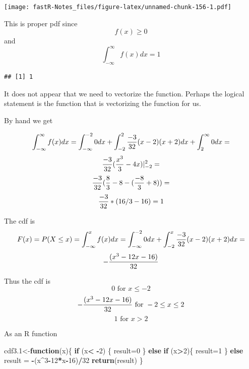 \documentclass[]{book}
\newenvironment{Shaded}{\begin{snugshade}}{\end{snugshade}}
\newcommand{\KeywordTok}[1]{\textcolor[rgb]{0.13,0.29,0.53}{\textbf{#1}}}
\newcommand{\DecValTok}[1]{\textcolor[rgb]{0.00,0.00,0.81}{#1}}
\newcommand{\StringTok}[1]{\textcolor[rgb]{0.31,0.60,0.02}{#1}}
\newcommand{\OtherTok}[1]{\textcolor[rgb]{0.56,0.35,0.01}{#1}}
\newcommand{\ControlFlowTok}[1]{\textcolor[rgb]{0.13,0.29,0.53}{\textbf{#1}}}
\newcommand{\OperatorTok}[1]{\textcolor[rgb]{0.81,0.36,0.00}{\textbf{#1}}}
\newcommand{\NormalTok}[1]{#1}
\theoremstyle{definition}
\theoremstyle{definition}
\theoremstyle{definition}
\theoremstyle{remark}
\begin{document}
\texttt{[image: fastR-Notes\_files/figure-latex/unnamed-chunk-156-1.pdf]}

This is proper pdf since \[f(x) \geq 0\] and
\[\int_{-\infty}^{\infty}f(x)dx=1\]

\begin{Shaded}
\end{Shaded}

\begin{verbatim}
## [1] 1
\end{verbatim}

It does not appear that we need to vectorize the function. Perhaps the
logical statement is the function that is vectorizing the function for
us.

By hand we get

\[\int_{-\infty}^{\infty}f(x)dx=\int_{-\infty}^{-2}0dx+\int_{-2}^{2}{-3 \over 32}(x-2)(x+2)dx+\int_{2}^{\infty}0dx=\]
\[{-3 \over 32}({x^3 \over 3} -4x) \vert_{-2}^{2}=\]
\[{-3 \over 32}({8 \over 3}-8 -({-8 \over 3} +8) )=\]
\[{-3 \over 32}*(16/3-16)=1\]

The cdf is
\[F(x)=P(X\leq x)=\int_{-\infty}^{x}f(x)dx=\int_{-\infty}^{-2}0dx+\int_{-2}^{x}{-3 \over 32}(x-2)(x+2)dx=\]
\[-{(x^3-12x-16) \over 32}\]

Thus the cdf is \[0 \mbox{ for }x \leq -2\]
\[-{(x^3-12x-16) \over 32} \mbox{ for } -2 \leq x \leq 2\]
\[1 \mbox{ for } x>2\]

As an R function

\begin{Shaded}
\begin{Highlighting}[]
\NormalTok{cdf3.}\DecValTok{1}\NormalTok{<-}\ControlFlowTok{function}\NormalTok{(x)\{}
    \ControlFlowTok{if}\NormalTok{ (x}\OperatorTok{<}\StringTok{ }\OperatorTok{-}\DecValTok{2}\NormalTok{) \{}
\NormalTok{        result=}\DecValTok{0}
\NormalTok{    \} }\ControlFlowTok{else} \ControlFlowTok{if}\NormalTok{ (x}\OperatorTok{>}\DecValTok{2}\NormalTok{)\{}
\NormalTok{        result=}\DecValTok{1}
\NormalTok{    \} }\ControlFlowTok{else}\NormalTok{ result =}\StringTok{ }\OperatorTok{-}\NormalTok{(x}\OperatorTok{^}\DecValTok{3}\OperatorTok{-}\DecValTok{12}\OperatorTok{*}\NormalTok{x}\OperatorTok{-}\DecValTok{16}\NormalTok{)}\OperatorTok{/}\DecValTok{32}
\KeywordTok{return}\NormalTok{(result)}
\NormalTok{\}}
\end{Highlighting}
\end{Shaded}
\end{document}
